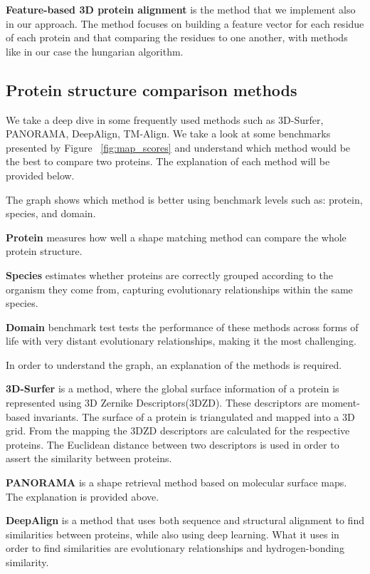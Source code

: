 \documentclass[\reportLanguage, twocolumn, 11pt]{article}
\begin{document}
\textbf{Feature-based 3D protein alignment} is the method that we implement also in our approach. The method focuses on building a feature vector for each residue of each protein and that comparing the residues to one another, with methods like in our case the hungarian algorithm. 

\subsection{Protein structure comparison methods}
We take a deep dive in some frequently used methods such as 3D-Surfer, PANORAMA, DeepAlign, TM-Align. We take a look at some benchmarks presented by Figure ~\ref{fig:map_scores} and understand which method would be the best to compare two proteins. The explanation of each method will be provided below.\cite{shape}

The graph shows which method is better using benchmark levels such as: protein, species, and domain. 

\textbf{Protein} measures how well a shape matching method can compare the whole protein structure\cite{shape}. 

\textbf{Species} estimates whether proteins are correctly grouped according to the organism they come from, capturing evolutionary relationships within the same species\cite{shape}.

\textbf{Domain} benchmark test tests the performance of these methods across forms of life with very distant evolutionary relationships, making it the most challenging\cite{shape}.

In order to understand the graph, an explanation of the methods is required.

\textbf{3D-Surfer} is a method, where the global surface information of a protein is represented using 3D Zernike Descriptors(3DZD). These descriptors are moment-based invariants. The surface of a protein is triangulated and mapped into a 3D grid. From the mapping the 3DZD descriptors are calculated for the respective proteins. The Euclidean distance between two descriptors is used in order to assert the similarity between proteins.\cite{shape} 

\textbf{PANORAMA} is a shape retrieval method based on molecular surface maps. The explanation is provided above.

\textbf{DeepAlign} is a method that uses both sequence and structural alignment to find similarities between proteins, while also using deep learning. What it uses in order to find similarities are evolutionary relationships and hydrogen-bonding similarity.\cite{shape}
\end{document}
